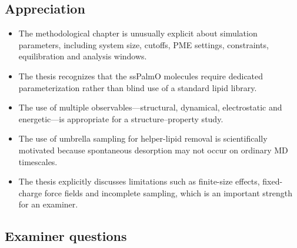 \documentclass[11pt,a4paper]{article}
\begin{document}
\subsection*{Appreciation}

\begin{itemize}[leftmargin=*]
\item The methodological chapter is unusually explicit about simulation parameters, including system size, cutoffs, PME settings, constraints, equilibration and analysis windows.
\item The thesis recognizes that the ssPalmO molecules require dedicated parameterization rather than blind use of a standard lipid library.
\item The use of multiple observables---structural, dynamical, electrostatic and energetic---is appropriate for a structure--property study.
\item The use of umbrella sampling for helper-lipid removal is scientifically motivated because spontaneous desorption may not occur on ordinary MD timescales.
\item The thesis explicitly discusses limitations such as finite-size effects, fixed-charge force fields and incomplete sampling, which is an important strength for an examiner.
\end{itemize}

\subsection*{Examiner questions}
\end{document}
